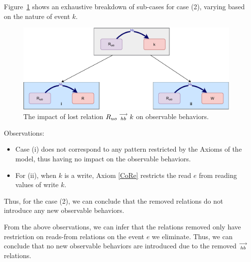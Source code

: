         Figure~\ref{elim_read:case2} shows an exhaustive breakdown of sub-cases for case (2), varying based
        on the nature of event $k$.
        \begin{figure}[H]
            \centering
            \includegraphics[scale=0.5]{5.Elimination/1.ValidEliminationCandidate/ReadElimProof/ProofParts/Part4_Case2.pdf}
            \caption{The impact of lost relation $R_{uo}\stackrel{\longrightarrow}{_{hb}}k$ on observable behaviors.}
            \label{elim_read:case2}
        \end{figure}

        Observations:
        \begin{itemize}
            \item Case (i) does not correspond to any pattern restricted by the Axioms of the model, thus having no impact on the observable behaviors. 
            \item For (ii), when $k$ is a write, Axiom \ref{CoRe} restricts the read $e$ from reading values of write $k$. 
        \end{itemize}

        Thus, for the case (2), we can conclude that the removed relations do not introduce any new observable behaviors.

        From the above observations, we can infer that the relations removed only have restriction on reads-from relations on the event $e$ we eliminate. 
        Thus, we can conclude that no new observable behaviors are introduced due to the removed $\stackrel{\longrightarrow}{_{hb}}$ relations. 